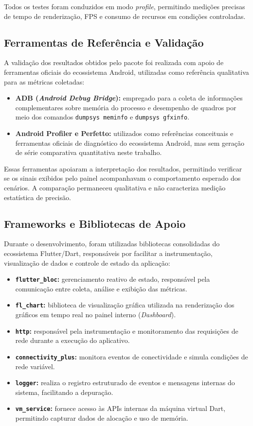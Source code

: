 Todos os testes foram conduzidos em modo \textit{profile}, permitindo medições precisas de tempo de renderização, FPS e consumo de recursos em condições controladas.

\subsection{Ferramentas de Referência e Validação}

A validação dos resultados obtidos pelo pacote foi realizada com apoio de ferramentas oficiais do ecossistema Android, utilizadas como referência qualitativa para as métricas coletadas:

\begin{itemize}
  \item \textbf{ADB (\textit{Android Debug Bridge}):} empregado para a coleta de informações complementares sobre memória do processo e desempenho de quadros por meio dos comandos \texttt{dumpsys meminfo} e \texttt{dumpsys gfxinfo}.
  \item \textbf{Android Profiler e Perfetto:} utilizados como referências conceituais e ferramentas oficiais de diagnóstico do ecossistema Android, mas sem geração de série comparativa quantitativa neste trabalho.
\end{itemize}

Essas ferramentas apoiaram a interpretação dos resultados, permitindo verificar se os sinais exibidos pelo painel acompanhavam o comportamento esperado dos cenários. A comparação permaneceu qualitativa e não caracteriza medição estatística de precisão.

\subsection{Frameworks e Bibliotecas de Apoio}

Durante o desenvolvimento, foram utilizadas bibliotecas consolidadas do ecossistema Flutter/Dart, responsáveis por facilitar a instrumentação, visualização de dados e controle de estado da aplicação:

\begin{itemize}
  \item \textbf{\texttt{flutter\_bloc}:} gerenciamento reativo de estado, responsável pela comunicação entre coleta, análise e exibição das métricas.
  \item \textbf{\texttt{fl\_chart}:} biblioteca de visualização gráfica utilizada na renderização dos gráficos em tempo real no painel interno (\textit{Dashboard}).
  \item \textbf{\texttt{http}:} responsável pela instrumentação e monitoramento das requisições de rede durante a execução do aplicativo.
  \item \textbf{\texttt{connectivity\_plus}:} monitora eventos de conectividade e simula condições de rede variável.
  \item \textbf{\texttt{logger}:} realiza o registro estruturado de eventos e mensagens internas do sistema, facilitando a depuração.
  \item \textbf{\texttt{vm\_service}:} fornece acesso às APIs internas da máquina virtual Dart, permitindo capturar dados de alocação e uso de memória.
\end{itemize}

